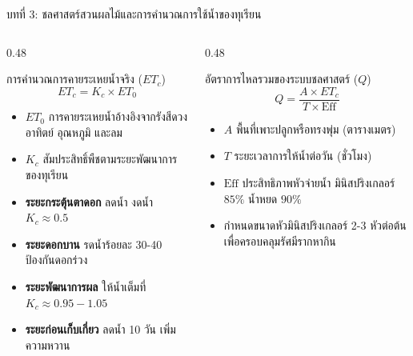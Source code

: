 \documentclass[aspectratio=169, 10pt]{beamer}
\begin{document}
\begin{frame}{บทที่ 3: ชลศาสตร์สวนผลไม้และการคำนวณการใช้น้ำของทุเรียน}
\begin{columns}[T]
    \begin{column}{0.48\textwidth}
        \begin{mastercard}{การคำนวณการคายระเหยน้ำจริง ($ET_c$)}
            \begin{equation*}
                ET_c = K_c \times ET_0
            \end{equation*}
            \begin{itemize}
                \item $ET_0$ การคายระเหยน้ำอ้างอิงจากรังสีดวงอาทิตย์ อุณหภูมิ และลม
                \item $K_c$ สัมประสิทธิ์พืชตามระยะพัฒนาการของทุเรียน
                \item \textbf{ระยะกระตุ้นตาดอก} ลดน้ำ งดน้ำ $K_c \approx 0.5$
                \item \textbf{ระยะดอกบาน} รดน้ำร้อยละ 30-40 ป้องกันดอกร่วง
                \item \textbf{ระยะพัฒนาการผล} ให้น้ำเต็มที่ $K_c \approx 0.95 - 1.05$
                \item \textbf{ระยะก่อนเก็บเกี่ยว} ลดน้ำ 10 วัน เพิ่มความหวาน
            \end{itemize}
        \end{mastercard}
    \end{column}
    \begin{column}{0.48\textwidth}
        \begin{goldcard}{อัตราการไหลรวมของระบบชลศาสตร์ ($Q$)}
            \begin{equation*}
                Q = \frac{A \times ET_c}{T \times \text{Eff}}
            \end{equation*}
            \begin{itemize}
                \item $A$ พื้นที่เพาะปลูกหรือทรงพุ่ม (ตารางเมตร)
                \item $T$ ระยะเวลาการให้น้ำต่อวัน (ชั่วโมง)
                \item $\text{Eff}$ ประสิทธิภาพหัวจ่ายน้ำ มินิสปริงเกลอร์ $85\%$ น้ำหยด $90\%$
                \item กำหนดขนาดหัวมินิสปริงเกลอร์ 2-3 หัวต่อต้นเพื่อครอบคลุมรัศมีรากหากิน
            \end{itemize}
        \end{goldcard}
    \end{column}
\end{columns}
\end{frame}
\end{document}
